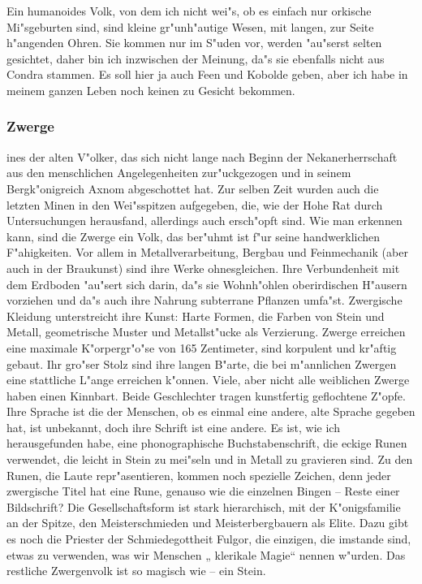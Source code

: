 \documentclass[a5paper,8pt]{book}
\begin{document}
Ein humanoides Volk, von dem ich nicht wei"s, ob es einfach nur orkische Mi"sgeburten sind, sind kleine gr"unh"autige Wesen, mit langen, zur Seite h"angenden Ohren. Sie kommen nur im S"uden vor, werden "au"serst selten gesichtet, daher bin ich inzwischen der Meinung, da"s sie ebenfalls nicht aus Condra stammen. Es soll hier ja auch Feen und Kobolde geben, aber ich habe in meinem ganzen Leben noch keinen zu Gesicht bekommen. 

\newpage

\subsubsection{ Zwerge}

ines der alten V"olker, das sich nicht lange nach Beginn der Nekanerherrschaft aus den menschlichen Angelegenheiten zur"uckgezogen und in seinem Bergk"onigreich Axnom abgeschottet hat. Zur selben Zeit wurden auch die letzten Minen in den Wei"sspitzen aufgegeben, die, wie der Hohe Rat durch Untersuchungen herausfand, allerdings auch ersch"opft sind. Wie man erkennen kann, sind die Zwerge ein Volk, das ber"uhmt ist f"ur seine handwerklichen F"ahigkeiten. Vor allem in Metallverarbeitung, Bergbau und Feinmechanik (aber auch in der Braukunst) sind ihre Werke ohnesgleichen. Ihre Verbundenheit mit dem Erdboden "au"sert sich darin, da"s sie Wohnh"ohlen oberirdischen H"ausern vorziehen und da"s auch ihre Nahrung subterrane Pflanzen umfa"st.  Zwergische Kleidung unterstreicht ihre Kunst: Harte Formen, die Farben von Stein und Metall, geometrische Muster und Metallst"ucke als Verzierung. Zwerge erreichen eine maximale K"orpergr"o"se von 165 Zentimeter, sind korpulent und kr"aftig gebaut. Ihr gro"ser Stolz 
sind ihre langen B"arte, die bei m"annlichen Zwergen eine stattliche L"ange erreichen k"onnen. Viele, aber nicht alle weiblichen Zwerge haben einen Kinnbart. Beide Geschlechter tragen kunstfertig geflochtene Z"opfe.  Ihre Sprache ist die der Menschen, ob es  einmal eine andere, alte Sprache gegeben hat, ist unbekannt, doch ihre Schrift ist eine andere. Es ist, wie ich herausgefunden habe, eine phonographische Buchstabenschrift, die eckige Runen verwendet, die leicht in Stein zu mei"seln und in Metall zu gravieren sind. Zu den Runen, die Laute repr"asentieren, kommen noch spezielle Zeichen, denn jeder zwergische Titel hat eine Rune, genauso wie die einzelnen Bingen – Reste einer Bildschrift? Die Gesellschaftsform ist stark hierarchisch, mit der K"onigsfamilie an der Spitze, den Meisterschmieden und Meisterbergbauern als Elite. Dazu gibt es noch die Priester der Schmiedegottheit Fulgor, die einzigen, die imstande sind, etwas zu verwenden, was wir Menschen „ klerikale Magie“ nennen w"urden. Das restliche 
Zwergenvolk ist so magisch wie – ein Stein. 
\end{document}
